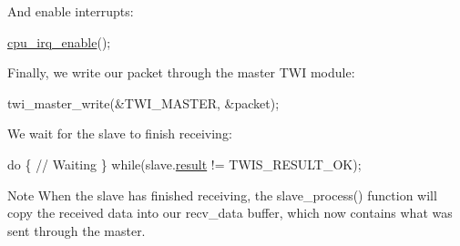 And enable interrupts\-: 
\begin{DoxyCode}
        \hyperlink{group__interrupt__group_gae4922a4bd8ba4150211fbc7f2302403c}{cpu\_irq\_enable}();
\end{DoxyCode}


Finally, we write our packet through the master T\-W\-I module\-: 
\begin{DoxyCode}
        twi\_master\_write(&TWI\_MASTER, &packet);
\end{DoxyCode}


We wait for the slave to finish receiving\-: 
\begin{DoxyCode}
        \textcolor{keywordflow}{do} \{
            \textcolor{comment}{// Waiting}
        \} \textcolor{keywordflow}{while}(slave.\hyperlink{struct_t_w_i___slave_a38f52b1274d890275ae25f68d289c8d8}{result} != TWIS\_RESULT\_OK);
\end{DoxyCode}
 \begin{DoxyNote}{Note}
When the slave has finished receiving, the slave\-\_\-process() function will copy the received data into our recv\-\_\-data buffer, which now contains what was sent through the master. 
\end{DoxyNote}
